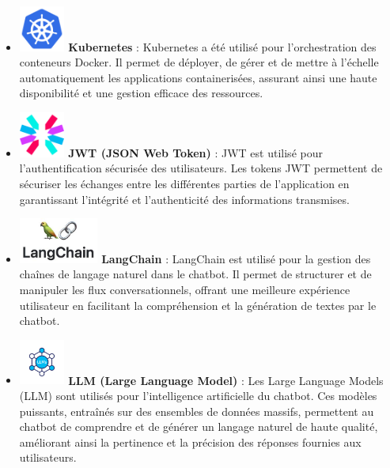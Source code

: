 \documentclass[a4paper, 11pt, openany]{report}
\begin{document}
\begin{itemize}
    \item \includegraphics[height=1.5cm]{images/kubernetes.png} \hspace{5pt} \textbf{Kubernetes} : 
    Kubernetes a été utilisé pour l'orchestration des conteneurs Docker. Il permet de déployer, de gérer et de mettre à l'échelle automatiquement les applications containerisées, assurant ainsi une haute disponibilité et une gestion efficace des ressources.

    \item \includegraphics[height=1.5cm]{images/jwt.png} \hspace{5pt} \textbf{JWT (JSON Web Token)}  : 
    JWT est utilisé pour l'authentification sécurisée des utilisateurs. Les tokens JWT permettent de sécuriser les échanges entre les différentes parties de l'application en garantissant l'intégrité et l'authenticité des informations transmises.


\item \includegraphics[height=1.5cm]{images/langchain.jpeg} \hspace{5pt} \textbf{LangChain}  : 
LangChain est utilisé pour la gestion des chaînes de langage naturel dans le chatbot. Il permet de structurer et de manipuler les flux conversationnels, offrant une meilleure expérience utilisateur en facilitant la compréhension et la génération de textes par le chatbot.

\item \includegraphics[height=1.5cm]{images/llm.png} \hspace{5pt} \textbf{LLM (Large Language Model)} : 
Les Large Language Models (LLM) sont utilisés pour l'intelligence artificielle du chatbot. Ces modèles puissants, entraînés sur des ensembles de données massifs, permettent au chatbot de comprendre et de générer un langage naturel de haute qualité, améliorant ainsi la pertinence et la précision des réponses fournies aux utilisateurs.


\end{itemize}
\end{document}

